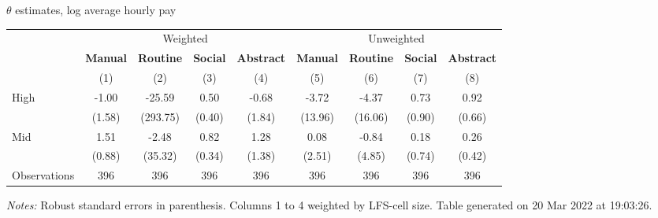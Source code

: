 \begin{center}
\begin{threeparttable}[!h]
\caption{$ \theta $ estimates, log average hourly pay}
\begin{tabular}{lcccccccc}
\toprule
\toprule
& \multicolumn{4}{c}{Weighted} & \multicolumn{4}{c}{Unweighted} \\
&\multicolumn{1}{c}{\textbf{Manual}}&\multicolumn{1}{c}{\textbf{Routine}}&\multicolumn{1}{c}{\textbf{Social}}&\multicolumn{1}{c}{\textbf{Abstract}}&\multicolumn{1}{c}{\textbf{Manual}}&\multicolumn{1}{c}{\textbf{Routine}}&\multicolumn{1}{c}{\textbf{Social}}&\multicolumn{1}{c}{\textbf{Abstract}} \\
\textbf{}&\multicolumn{1}{c}{(1)}&\multicolumn{1}{c}{(2)}&\multicolumn{1}{c}{(3)}&\multicolumn{1}{c}{(4)}&\multicolumn{1}{c}{(5)}&\multicolumn{1}{c}{(6)}&\multicolumn{1}{c}{(7)}&\multicolumn{1}{c}{(8)} \\
\midrule
High                &       -1.00&      -25.59&        0.50&       -0.68&       -3.72&       -4.37&        0.73&        0.92\\
                    &      (1.58)&    (293.75)&      (0.40)&      (1.84)&     (13.96)&     (16.06)&      (0.90)&      (0.66)\\
Mid                 &        1.51&       -2.48&        0.82&        1.28&        0.08&       -0.84&        0.18&        0.26\\
                    &      (0.88)&     (35.32)&      (0.34)&      (1.38)&      (2.51)&      (4.85)&      (0.74)&      (0.42)\\
Observations        &         396&         396&         396&         396&         396&         396&         396&         396\\
\bottomrule
\bottomrule
\end{tabular}
\begin{tablenotes}
\item \footnotesize \textit{Notes:} Robust standard errors in parenthesis. Columns 1 to 4 weighted by LFS-cell size. Table generated on 20 Mar 2022 at 19:03:26.
\end{tablenotes}
\end{threeparttable}
\end{center}
